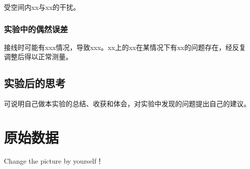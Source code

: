 \documentclass[UTF8]{ctexart}
\begin{document}
受空间内xx与xx的干扰。

\subsubsection{实验中的偶然误差}
接线时可能有xxx情况，导致xxx。xx上的xx在某情况下有xx的问题存在，经反复调整后得以正常测量。

\subsection{实验后的思考}
可说明自己做本实验的总结、收获和体会，对实验中发现的问题提出自己的建议。

\newpage
\section{原始数据}
\begin{center}
    Change the picture by yourself！
    
    
\end{center}




\end{document}
